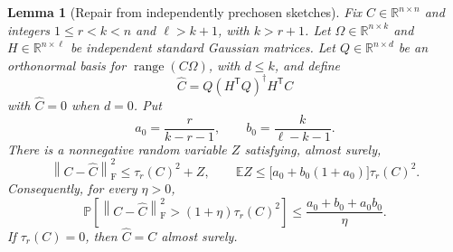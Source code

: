 \documentclass[11pt]{article}
\numberwithin{equation}{section}
\newtheorem{lemma}[theorem]{Lemma}
\theoremstyle{remark}
\newcommand{\R}{\mathbb R}
\newcommand{\E}{\mathbb E}
\newcommand{\Prob}{\mathbb P}
\newcommand{\range}{\operatorname{range}}
\newcommand{\norm}[1]{\left\lVert #1\right\rVert_{\mathrm F}}
\newcommand{\T}{\mathsf T}
\begin{document}
\begin{lemma}[Repair from independently prechosen sketches]\label{lem:repair}
Fix $C\in\R^{n\times n}$ and integers $1\le r<k<n$ and $\ell>k+1$, with $k>r+1$.
Let $\Omega\in\R^{n\times k}$ and $H\in\R^{n\times\ell}$ be independent standard Gaussian matrices. Let $Q\in\R^{n\times d}$ be an orthonormal basis for $\range(C\Omega)$, with $d\le k$, and define
\[
 \widehat C=Q(H^\T Q)^\dagger H^\T C
\]
with $\widehat C=0$ when $d=0$.
Put
\begin{equation}\label{eq:ab}
 a_0=\frac{r}{k-r-1},\qquad b_0=\frac{k}{\ell-k-1}.
\end{equation}
There is a nonnegative random variable $Z$ satisfying, almost surely,
\begin{equation}\label{eq:majorant}
 \norm{C-\widehat C}^2\le\tau_r(C)^2+Z,
 \qquad
 \E Z\le\bigl[a_0+b_0(1+a_0)\bigr]\tau_r(C)^2.
\end{equation}
Consequently, for every $\eta>0$,
\begin{equation}\label{eq:repairprob}
 \Prob\!\left[\norm{C-\widehat C}^2>(1+\eta)\tau_r(C)^2\right]
 \le\frac{a_0+b_0+a_0b_0}{\eta}.
\end{equation}
If $\tau_r(C)=0$, then $\widehat C=C$ almost surely.
\end{lemma}
\end{document}
